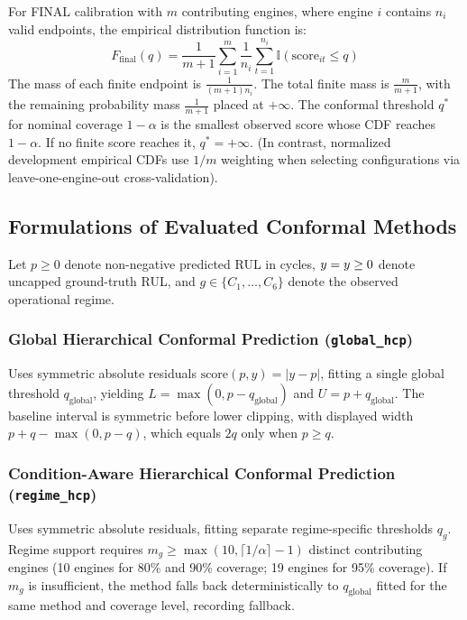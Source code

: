 For FINAL calibration with $m$ contributing engines, where engine $i$ contains $n_i$ valid endpoints, the empirical distribution function is:
\begin{equation}
F_{\text{final}}(q) = \frac{1}{m + 1} \sum_{i=1}^m \frac{1}{n_i} \sum_{t=1}^{n_i} \mathbb{I}(\text{score}_{it} \le q)
\end{equation}
The mass of each finite endpoint is $\frac{1}{(m+1)n_i}$. The total finite mass is $\frac{m}{m+1}$, with the remaining probability mass $\frac{1}{m+1}$ placed at $+\infty$. The conformal threshold $q^*$ for nominal coverage $1 - \alpha$ is the smallest observed score whose CDF reaches $1 - \alpha$. If no finite score reaches it, $q^* = +\infty$. (In contrast, normalized development empirical CDFs use $1/m$ weighting when selecting configurations via leave-one-engine-out cross-validation).

\subsection{Formulations of Evaluated Conformal Methods}
Let $p \ge 0$ denote non-negative predicted RUL in cycles, $y = y \ge 0$ denote uncapped ground-truth RUL, and $g \in \{C_1, \dots, C_6\}$ denote the observed operational regime.

\subsubsection{Global Hierarchical Conformal Prediction (\texttt{global\_hcp})}
Uses symmetric absolute residuals $\text{score}(p, y) = |y - p|$, fitting a single global threshold $q_{\text{global}}$, yielding $L = \max(0, p - q_{\text{global}})$ and $U = p + q_{\text{global}}$. The baseline interval is symmetric before lower clipping, with displayed width $p + q - \max(0, p - q)$, which equals $2q$ only when $p \ge q$.

\subsubsection{Condition-Aware Hierarchical Conformal Prediction (\texttt{regime\_hcp})}
Uses symmetric absolute residuals, fitting separate regime-specific thresholds $q_g$. Regime support requires $m_g \ge \max(10, \lceil 1/\alpha \rceil - 1)$ distinct contributing engines (10 engines for 80\% and 90\% coverage; 19 engines for 95\% coverage). If $m_g$ is insufficient, the method falls back deterministically to $q_{\text{global}}$ fitted for the same method and coverage level, recording fallback.

